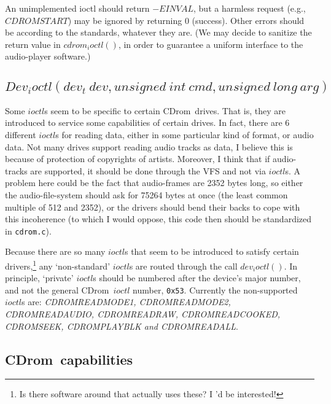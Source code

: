 \documentclass{article}
\def\cdrom{{\sc CDrom}}
\def\cdromc{{\tt cdrom.c}}
\begin{document}
An unimplemented ioctl should return $-EINVAL$, but a harmless request
(e.g., $CDROMSTART$) may be ignored by returning 0 (success). Other
errors should be according to the standards, whatever they are. (We
may decide to sanitize the return value in $cdrom_ioctl()$, in order
to guarantee a uniform interface to the audio-player software.)

\subsection{$Dev_ioctl(dev_t\ dev, unsigned\ int\ cmd, unsigned\ long\
arg)$}

Some $ioctl$s seem to be specific to certain \cdrom\ drives. That is,
they are introduced to service some capabilities of certain drives. In
fact, there are 6 different $ioctl$s for reading data, either in some
particular kind of format, or audio data. Not many drives support
reading audio tracks as data, I believe this is because of protection
of copyrights of artists. Moreover, I think that if audio-tracks are
supported, it should be done through the VFS and not via $ioctl$s. A
problem here could be the fact that audio-frames are 2352 bytes long,
so either the audio-file-system should ask for 75264 bytes at once
(the least common multiple of 512 and 2352), or the drivers should
bend their backs to cope with this incoherence (to which I would
oppose, this code then should be standardized in \cdromc).

Because there are so many $ioctl$s that seem to be introduced to
satisfy certain drivers,\footnote{Is there software around that actually uses
these? I 'd be interested!} any `non-standard' $ioctl$s are routed through
the call $dev_ioctl()$. In principle, `private' $ioctl$s should be
numbered after the device's major number, and not the general \cdrom\
$ioctl$ number, {\tt 0x53}. Currently the non-supported $ioctl$s are:
{\it CDROMREADMODE1, CDROMREADMODE2, CDROMREADAUDIO, CDROMREADRAW,
CDROMREADCOOKED, CDROMSEEK, CDROMPLAY\-BLK and CDROMREADALL}. 

\subsection{\cdrom\ capabilities}
\end{document}
